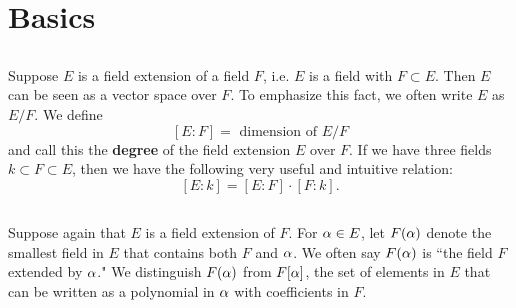 \section{Basics}
\subsection{}
Suppose $E$ is a field extension of a field $F$, i.e. $E$ is a field with $F \subset E$. Then $E$ can be seen as a vector space over $F$. To emphasize this fact, we often write $E$ as $E/F$. We define
\[
    [E : F] = \text{ dimension of } E/F
\]
and call this the \textbf{degree} of the field extension $E$ over $F$. If we have three fields $k \subset F \subset E$, then we have the following very useful and intuitive relation:
\[
    [E : k] = [E : F] \cdot [F : k].
\]

\subsection{}
Suppose again that $E$ is a field extension of $F$. For $\alpha \in E$, let $F(\alpha)$ denote the smallest field in $E$ that contains both $F$ and $\alpha$. We often say $F(\alpha)$ is ``the field $F$ extended by $\alpha$." We distinguish $F(\alpha)$ from $F[\alpha]$, the set of elements in $E$ that can be written as a polynomial in $\alpha$ with coefficients in $F$.
